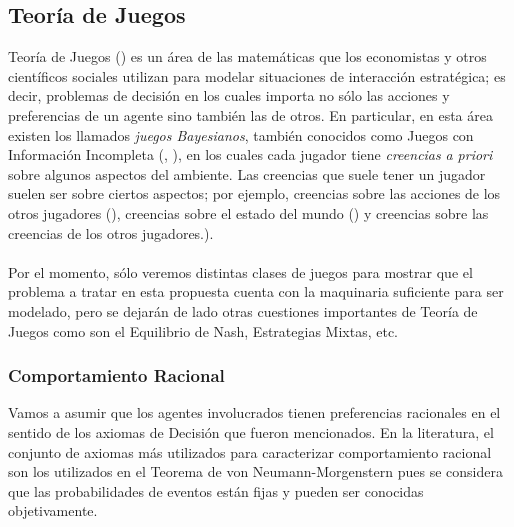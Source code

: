 \documentclass[11pt]{article}
\theoremstyle{plain}
\begin{document}
\subsection{Teoría de Juegos}{\label{juegos}}
Teoría de Juegos (\cite{osborne1994course}) es un área de las matemáticas que los economistas y otros científicos sociales utilizan para modelar situaciones de interacción estratégica; es decir, problemas de decisión en los cuales importa no sólo las acciones y preferencias de un agente sino también las de otros. En particular, en esta área existen los llamados \textit{juegos Bayesianos}, también conocidos como Juegos con Información Incompleta (\cite{osborne1994course}, \cite{10.1007/978-94-010-0189-2_25}),  en los cuales cada jugador tiene \textit{creencias} \textit{a priori} sobre algunos aspectos del ambiente. Las creencias que suele tener un jugador suelen ser sobre ciertos aspectos; por ejemplo, creencias sobre las acciones de los otros jugadores (\cite{costa2008stated}), creencias sobre el estado del mundo (\cite{dominitz2009empirical}) y creencias sobre las creencias de los otros jugadores.).\\
\\
\indent Por el momento, sólo veremos distintas clases de juegos para mostrar que el problema a tratar en esta propuesta cuenta con la maquinaria suficiente para ser modelado, pero se dejarán de lado otras cuestiones importantes de Teoría de Juegos como son el Equilibrio de Nash, Estrategias Mixtas, etc. 
\subsubsection{Comportamiento Racional}
Vamos a asumir que los agentes involucrados tienen preferencias racionales en el sentido de los axiomas de Decisión que fueron mencionados. En la literatura, el conjunto de axiomas más utilizados para caracterizar comportamiento racional son los utilizados en el Teorema de von Neumann-Morgenstern pues se considera que las probabilidades de eventos están fijas y pueden ser conocidas objetivamente.
\end{document}
